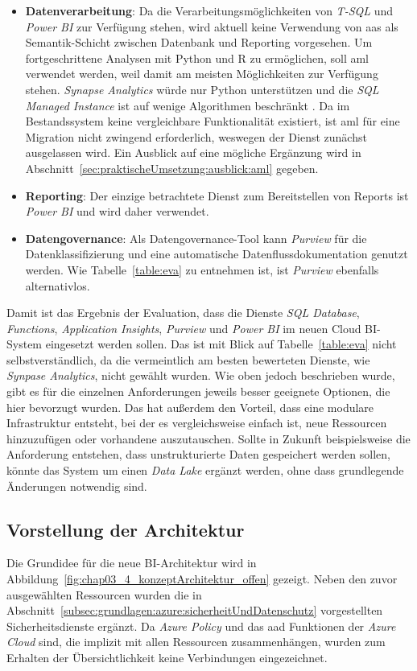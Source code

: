 \begin{itemize}
\item \textbf{Datenverarbeitung}: Da die Verarbeitungsmöglichkeiten von \textit{T-SQL} und \textit{Power BI} zur Verfügung stehen, wird aktuell keine Verwendung von \ac{aas} als Semantik-Schicht zwischen Datenbank und Reporting vorgesehen. Um fortgeschrittene Analysen mit Python und R zu ermöglichen, soll \ac{aml} verwendet werden, weil damit am meisten Möglichkeiten zur Verfügung stehen. \textit{Synapse Analytics} würde nur Python unterstützen und die \textit{SQL Managed Instance} ist auf wenige Algorithmen beschränkt \cite{etaati_introduction_2019}.
Da im Bestandssystem keine vergleichbare Funktionalität existiert, ist \ac{aml} für eine Migration nicht zwingend erforderlich, weswegen der Dienst zunächst ausgelassen wird. Ein Ausblick auf eine mögliche Ergänzung wird in Abschnitt~\ref{sec:praktischeUmsetzung:ausblick:aml} gegeben.
\item \textbf{Reporting}: Der einzige betrachtete Dienst zum Bereitstellen von Reports ist \textit{Power BI} und wird daher verwendet.
\item \textbf{Datengovernance}: Als Datengovernance-Tool kann \textit{Purview} für die Datenklassifizierung und eine automatische Datenflussdokumentation genutzt werden. Wie Tabelle~\ref{table:eva} zu entnehmen ist, ist \textit{Purview} ebenfalls alternativlos.
\end{itemize}
 
 Damit ist das Ergebnis der Evaluation, dass die Dienste \textit{SQL Database}, \textit{Functions}, \textit{Application Insights}, \textit{Purview} und \textit{Power BI} im neuen Cloud BI-System eingesetzt werden sollen. Das ist mit Blick auf Tabelle~\ref{table:eva} nicht selbstverständlich, da die vermeintlich am besten bewerteten Dienste, wie \textit{Synpase Analytics}, nicht gewählt wurden. Wie oben jedoch beschrieben wurde, gibt es für die einzelnen Anforderungen jeweils besser geeignete Optionen, die hier bevorzugt wurden. Das hat außerdem den Vorteil, dass eine modulare Infrastruktur entsteht, bei der es vergleichsweise einfach ist, neue Ressourcen hinzuzufügen oder vorhandene auszutauschen. Sollte in Zukunft beispielsweise die Anforderung entstehen, dass unstrukturierte Daten gespeichert werden sollen, könnte das System um einen \textit{Data Lake} ergänzt werden, ohne dass grundlegende Änderungen notwendig sind.




\subsection{Vorstellung der Architektur}
Die Grundidee für die neue BI-Architektur wird in Abbildung~\ref{fig:chap03_4_konzeptArchitektur_offen} gezeigt. Neben den zuvor ausgewählten Ressourcen wurden die in Abschnitt~\ref{subsec:grundlagen:azure:sicherheitUndDatenschutz} vorgestellten Sicherheitsdienste ergänzt. Da \textit{Azure Policy} und das \ac{aad} Funktionen der \textit{Azure Cloud} sind, die implizit mit allen Ressourcen zusammenhängen, wurden zum Erhalten der Übersichtlichkeit keine Verbindungen eingezeichnet.

